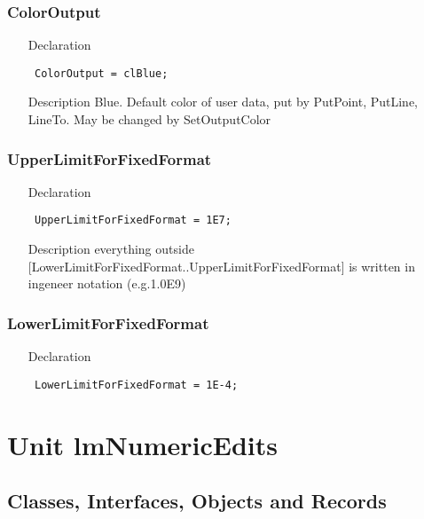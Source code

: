 \documentclass[12pt,a4paper,oneside]{report}
\newcommand{\declarationitem}[1]{{\addfontfeatures{FakeBold=1.3} #1}}
\newcommand{\descriptiontitle}[1]{{\addfontfeatures{FakeSlant}#1}}
\newcommand{\code}[1]{\texttt{#1}}
\begin{document}
\subsection*{ColorOutput}
\label{lmcoordsys-ColorOutput}
\begin{itemize}\item[\declarationitem{Declaration}\hfill]
\begin{flushleft}
\code{
ColorOutput    =  clBlue;}
\end{flushleft}
\item[\descriptiontitle{Description}]
Blue. Default color of user data, put by PutPoint, PutLine, LineTo. May be changed by SetOutputColor
\end{itemize}
\subsection*{UpperLimitForFixedFormat}
\label{lmcoordsys-UpperLimitForFixedFormat}
\begin{itemize}\item[\declarationitem{Declaration}\hfill]
\begin{flushleft}
\code{
UpperLimitForFixedFormat = 1E7;}
\end{flushleft}
\item[\descriptiontitle{Description}]
everything outside [LowerLimitForFixedFormat..UpperLimitForFixedFormat] is written in ingeneer notation (e.g.1.0E9)
\end{itemize}
\subsection*{LowerLimitForFixedFormat}
\label{lmcoordsys-LowerLimitForFixedFormat}
\begin{itemize}\item[\declarationitem{Declaration}\hfill]
\begin{flushleft}
\code{
LowerLimitForFixedFormat = 1E-4;}
\end{flushleft}
\end{itemize}

\chapter{Unit lmNumericEdits}
\label{lmnumericedits}
\section{Classes, Interfaces, Objects and Records}
\end{document}
